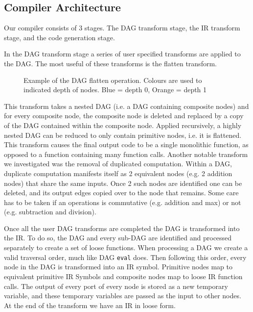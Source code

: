 \subsection{Compiler Architecture}
Our compiler consists of 3 stages.
The DAG transform stage, the IR transform stage, and the code generation stage.

In the DAG transform stage a series of user specified transforms are applied to the DAG.
The most useful of these transforms is the flatten transform.

\begin{figure}[h!]
    \centering
    \hspace{1em}
    \hspace{1em}
    \caption{Example of the DAG flatten operation. Colours are used to indicated depth of nodes. Blue = depth 0, Orange = depth 1}\label{fig:bn}
\end{figure}

This transform takes a nested DAG (i.e. a DAG containing composite nodes) and for every composite node, the composite node is deleted and replaced by a copy of the DAG contained within the composite node.
Applied recursively, a highly nested DAG can be reduced to only contain primitive nodes, i.e. it is flattened.
This transform causes the final output code to be a single monolithic function, as opposed to a function containing many function calls.
Another notable transform we investigated was the removal of duplicated computation.
Within a DAG, duplicate computation manifests itself as 2 equivalent nodes (e.g. 2 addition nodes) that share the same inputs.
Once 2 such nodes are identified one can be deleted, and its output edges copied over to the node that remains.
Some care has to be taken if an operations is commutative (e.g. addition and max) or not (e.g. subtraction and division).

Once all the user DAG transforms are completed the DAG is transformed into the IR.
To do so, the DAG and every sub-DAG are identified and processed separately to create a set of loose functions.
When processing a DAG we create a valid traversal order, much like DAG \texttt{eval} does.
Then following this order, every node in the DAG is transformed into an IR symbol.
Primitive nodes map to equivalent primitive IR Symbols and composite nodes map to loose IR function calls.
The output of every port of every node is stored as a new temporary variable, and these temporary variables are passed as the input to other nodes.
At the end of the transform we have an IR in loose form.

